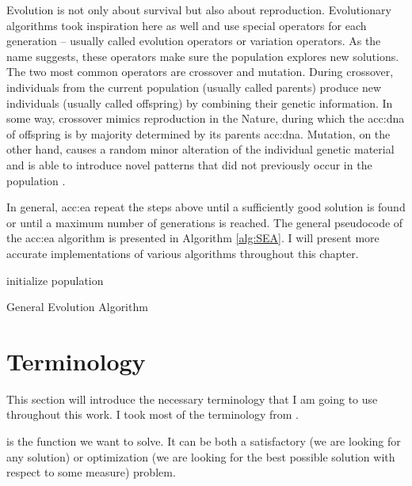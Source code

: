 Evolution is not only about survival but also about reproduction. Evolutionary algorithms took inspiration here as well and use special operators for each generation -- usually called evolution operators or variation operators. As the name suggests, these operators make sure the population explores new solutions. The two most common operators are crossover and mutation. During crossover, individuals from the current population (usually called parents) produce new individuals (usually called offspring) by combining their genetic information. In some way, crossover mimics reproduction in the Nature, during which the \acrshort{acc:dna} of offspring is by majority determined by its parents \acrshort{acc:dna}. Mutation, on the other hand, causes a random minor alteration of the individual genetic material and is able to introduce novel patterns that did not previously occur in the population \citep{HowToSolveItModernHeuristics}.

In general, \acrshort{acc:ea} repeat the steps above until a sufficiently good solution is found or until a maximum number of generations is reached. The general pseudocode of the \acrshort{acc:ea} algorithm is presented in Algorithm \ref{alg:SEA}. I will present more accurate implementations of various algorithms throughout this chapter.

\begin{algorithm}
    \SetAlgoLined
    initialize population\;
    \caption{General Evolution Algorithm}
    \label{alg:SEA}
\end{algorithm}




\section{Terminology}

This section will introduce the necessary terminology that I am going to use throughout this work. I took most of the terminology from \citet{IntroductionToEA}.

 is the function we want to solve. It can be both a satisfactory (we are looking for any solution) or optimization (we are looking for the best possible solution with respect to some measure) problem.

